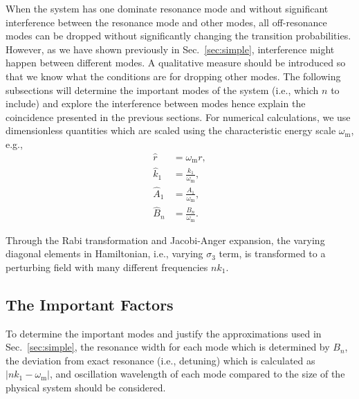 \documentclass[%
reprint,
 amsmath,amssymb,
 aps,
]{revtex4-1}
\begin{document}
When the system has one dominate resonance mode and without significant interference between the resonance mode and other modes, all off-resonance modes can be dropped without significantly changing the transition probabilities. However, as we have shown previously in Sec.~\ref{sec:simple}, interference might happen between different modes. A qualitative measure should be introduced so that we know what the conditions are for dropping other modes. The following subsections will determine the important modes of the system (i.e., which $n$ to include) and explore the interference between modes hence explain the coincidence presented in the previous sections. For numerical calculations, we use dimensionless quantities which are scaled using the characteristic energy scale $\omega_{\mathrm{m}}$, e.g.,
\begin{align*}
    \hat r &= \omega_{\mathrm{m}}r, \\
    \hat k_1 & = \frac{k_1}{\omega_{\mathrm{m}}}, \\
    \hat A_1 & = \frac{A_1}{\omega_{\mathrm{m}}}, \\
    \hat B_n &= \frac{B_n}{\omega_{\mathrm{m}}}.
\end{align*}

Through the Rabi transformation and Jacobi-Anger expansion, the varying diagonal elements in Hamiltonian, i.e., varying $\sigma_3$ term, is transformed to a perturbing field with many different frequencies $n k_1$.






\subsection{The Important Factors}




To determine the important modes and justify the approximations used in Sec.~\ref{sec:simple}, the resonance width for each mode which is determined by $B_n$, the deviation from exact resonance (i.e., detuning) which is calculated as $\lvert n k_1 - \omega_{\mathrm{m}} \rvert$, and oscillation wavelength of each mode compared to the size of the physical system should be considered.
\end{document}
